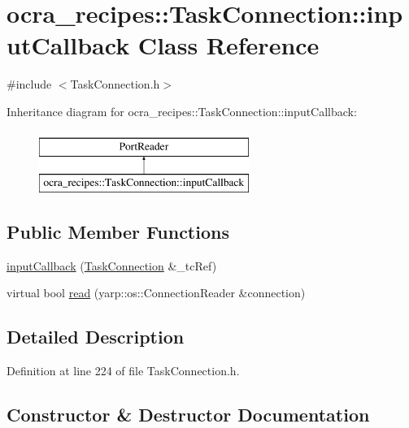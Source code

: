 \hypertarget{classocra__recipes_1_1TaskConnection_1_1inputCallback}{}\section{ocra\+\_\+recipes\+:\+:Task\+Connection\+:\+:input\+Callback Class Reference}
\label{classocra__recipes_1_1TaskConnection_1_1inputCallback}


{\ttfamily \#include $<$Task\+Connection.\+h$>$}

Inheritance diagram for ocra\+\_\+recipes\+:\+:Task\+Connection\+:\+:input\+Callback\+:\begin{figure}[H]
\begin{center}
\leavevmode
\includegraphics[height=2.000000cm]{da/d7d/classocra__recipes_1_1TaskConnection_1_1inputCallback}
\end{center}
\end{figure}
\subsection*{Public Member Functions}
\begin{DoxyCompactItemize}
\item 
\hyperlink{classocra__recipes_1_1TaskConnection_1_1inputCallback_a98ccd226e21cf3e6547689739bc88c8d}{input\+Callback} (\hyperlink{classocra__recipes_1_1TaskConnection}{Task\+Connection} \&\+\_\+tc\+Ref)
\item 
virtual bool \hyperlink{classocra__recipes_1_1TaskConnection_1_1inputCallback_a6572ca3aa11c347ecd414ea760ae89bc}{read} (yarp\+::os\+::\+Connection\+Reader \&connection)
\end{DoxyCompactItemize}


\subsection{Detailed Description}


Definition at line 224 of file Task\+Connection.\+h.



\subsection{Constructor \& Destructor Documentation}
\hypertarget{classocra__recipes_1_1TaskConnection_1_1inputCallback_a98ccd226e21cf3e6547689739bc88c8d}{}\label{classocra__recipes_1_1TaskConnection_1_1inputCallback_a98ccd226e21cf3e6547689739bc88c8d} 
